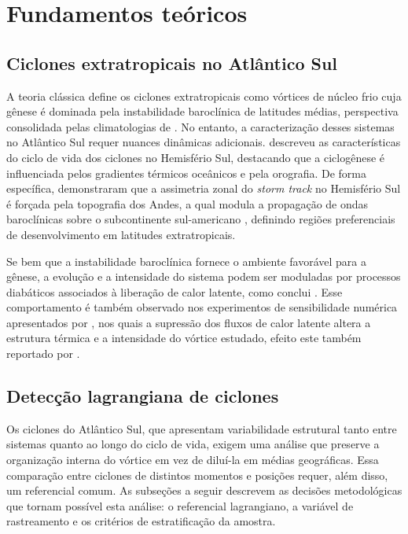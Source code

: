 \chapter{Fundamentos teóricos}\label{ch:theoretical_background}


\section{Ciclones extratropicais no Atlântico Sul}\label{sec:tb_fundamentos}

A teoria clássica define os ciclones extratropicais como vórtices de núcleo frio cuja gênese é dominada pela instabilidade baroclínica de latitudes médias, perspectiva consolidada pelas climatologias de \citet{hoskins2005new}. No entanto, a caracterização desses sistemas no Atlântico Sul requer nuances dinâmicas adicionais. \citet{sinclair1995climatology} descreveu as características do ciclo de vida dos ciclones no Hemisfério Sul, destacando que a ciclogênese é influenciada pelos gradientes térmicos oceânicos e pela orografia.
De forma específica, \citet{inatsu2004zonal} demonstraram que a assimetria zonal do \textit{storm track} no Hemisfério Sul é forçada pela topografia dos Andes, a qual modula a propagação de ondas baroclínicas sobre o subcontinente sul-americano \citep{vera2002cold}, definindo regiões preferenciais de desenvolvimento em latitudes extratropicais.

Se bem que a instabilidade baroclínica fornece o ambiente favorável para a gênese, a evolução e a intensidade do sistema podem ser moduladas por processos diabáticos associados à liberação de calor latente, como conclui \citet{coutodesouza2024thesis}.
Esse comportamento é também observado nos experimentos de sensibilidade numérica apresentados por \citet{reboita2022from}, nos quais a supressão dos fluxos de calor latente altera a estrutura térmica e a intensidade do vórtice estudado, efeito este também reportado por \citet{gozzo2013air}.

\section{Detecção lagrangiana de ciclones}\label{sec:tb_vorticidad}
Os ciclones do Atlântico Sul, que apresentam variabilidade estrutural tanto entre sistemas quanto ao longo do ciclo de vida,
exigem uma análise que preserve a organização interna do vórtice em vez de diluí-la em médias geográficas.
Essa comparação entre ciclones de distintos momentos e posições requer, além disso, um referencial comum.
As subseções a seguir descrevem as decisões metodológicas que tornam possível esta análise: o referencial lagrangiano, a variável de rastreamento e os critérios de estratificação da amostra.

